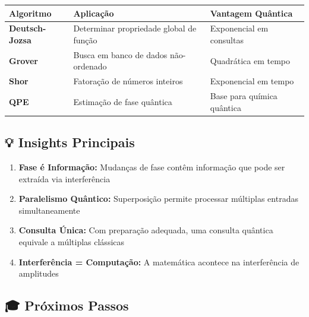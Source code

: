 \documentclass[
  brazilian,
]{report}
\newcounter{none} %
\providecommand{\tightlist}{%
  \setlength{\itemsep}{0pt}\setlength{\parskip}{0pt}}
\begin{document}
{\def\LTcaptype{none} %
\begin{longtable}[]{@{}
  >{\raggedright\arraybackslash}p{}
  >{\raggedright\arraybackslash}p{}
  >{\raggedright\arraybackslash}p{}@{}}
\toprule\noalign{}
\begin{minipage}[b]{\linewidth}\raggedright
Algoritmo
\end{minipage} & \begin{minipage}[b]{\linewidth}\raggedright
Aplicação
\end{minipage} & \begin{minipage}[b]{\linewidth}\raggedright
Vantagem Quântica
\end{minipage} \\
\midrule\noalign{}
\endhead
\bottomrule\noalign{}
\endlastfoot
\textbf{Deutsch-Jozsa} & Determinar propriedade global de função &
Exponencial em consultas \\
\textbf{Grover} & Busca em banco de dados não-ordenado & Quadrática em
tempo \\
\textbf{Shor} & Fatoração de números inteiros & Exponencial em tempo \\
\textbf{QPE} & Estimação de fase quântica & Base para química
quântica \\
\end{longtable}
}

\subsection{💡 Insights Principais}\label{insights-principais}

\begin{enumerate}
\def\labelenumi{\arabic{enumi}.}
\tightlist
\item
  \textbf{Fase é Informação:} Mudanças de fase contêm informação que
  pode ser extraída via interferência
\item
  \textbf{Paralelismo Quântico:} Superposição permite processar
  múltiplas entradas simultaneamente
\item
  \textbf{Consulta Única:} Com preparação adequada, uma consulta
  quântica equivale a múltiplas clássicas
\item
  \textbf{Interferência = Computação:} A matemática acontece na
  interferência de amplitudes
\end{enumerate}

\subsection{🎓 Próximos Passos}\label{pruxf3ximos-passos-2}
\end{document}
